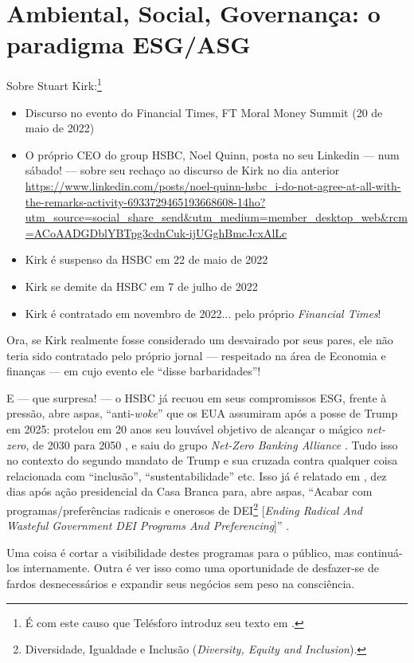 \documentclass[12pt]{article}
\begin{document}
\section{Ambiental, Social, Governança: o paradigma ESG/ASG}
Sobre Stuart Kirk:\footnote{É com este causo que Telésforo introduz seu texto em \cite{Telesforo2025}.}
\begin{itemize}
    \item Discurso no evento do Financial Times, FT Moral Money Summit \cite{Kirk2022} (20 de maio de 2022)
    \item O próprio CEO do group HSBC, Noel Quinn, posta no seu Linkedin --- num sábado! --- sobre seu rechaço ao discurso de Kirk no dia anterior \url{https://www.linkedin.com/posts/noel-quinn-hsbc_i-do-not-agree-at-all-with-the-remarks-activity-6933729465193668608-14ho?utm_source=social_share_send&utm_medium=member_desktop_web&rcm=ACoAADGDblYBTpg3cdnCuk-ijUGghBmcJcxAlLc}
    \item Kirk é suspenso da HSBC em 22 de maio de 2022 \cite{Makortoff2022}
    \item Kirk se demite da HSBC em 7 de julho de 2022 \cite{Reuters2022}
    \item Kirk é contratado em novembro de 2022... pelo próprio \textit{Financial Times}! \cite{FinancialTimes2022}
\end{itemize}


Ora, se Kirk realmente fosse considerado um desvairado por seus pares, ele não teria sido contratado pelo próprio jornal --- respeitado na área de Economia e finanças --- em cujo evento ele ``disse barbaridades''! 

E --- que surpresa! --- o HSBC já recuou em seus compromissos ESG, frente à pressão, abre aspas, ``anti-\textit{woke}'' que os EUA assumiram após a posse de Trump em 2025: protelou em 20 anos seu louvável objetivo de alcançar o mágico \textit{net-zero}, de 2030 para 2050 \cite{Segal2025a}, e saiu do grupo \textit{Net-Zero Banking Alliance} \cite{Segal2025}. Tudo isso no contexto do segundo mandato de Trump e sua cruzada contra qualquer coisa relacionada com ``inclusão'', ``sustentabilidade'' etc. Isso já é relatado em \cite{Mirza2025}, dez dias após ação presidencial da Casa Branca para, abre aspas, ``Acabar com programas/preferências radicais e onerosos de DEI\footnote{Diversidade, Igualdade e Inclusão (\textit{Diversity, Equity and Inclusion}).} [\textit{Ending Radical And Wasteful Government DEI Programs And Preferencing}]'' \cite{WhiteHouse2025}.

Uma coisa é cortar a visibilidade destes programas para o público, mas continuá-los internamente. Outra é ver isso como uma oportunidade de desfazer-se de fardos desnecessários e expandir seus negócios sem peso na consciência. 
\end{document}
